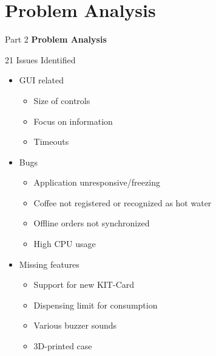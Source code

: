 \documentclass[t]{beamer}
\begin{document}
\section{Problem Analysis}
\begin{frame}{Part 2}
    \Huge\textbf{Problem Analysis}
\end{frame}
\begin{frame}{21 Issues Identified}
    \begin{itemize}
        \item GUI related
              \begin{itemize}
                  \item Size of controls
                  \item Focus on information
                  \item Timeouts
              \end{itemize}
        \item Bugs
              \begin{itemize}
                  \item Application unresponsive/freezing
                  \item Coffee not registered or recognized as hot water
                  \item Offline orders not synchronized
                  \item High CPU usage
              \end{itemize}
        \item Missing features
              \begin{itemize}
                  \item Support for new KIT-Card
                  \item Dispensing limit for consumption
                  \item Various buzzer sounds
                  \item 3D-printed case
              \end{itemize}

\end{itemize}
\end{frame}
\end{document}
